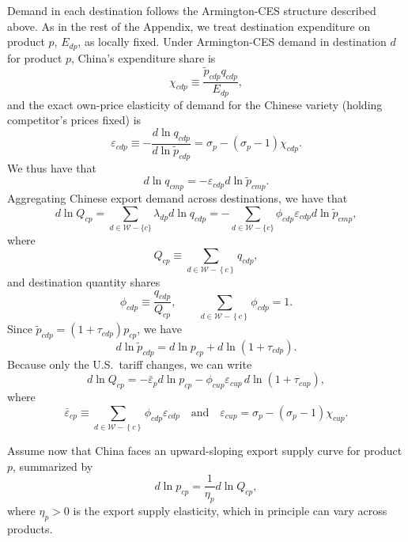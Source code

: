 \documentclass[english,12pt]{article}
\theoremstyle{definition}
\begin{document}
Demand in each destination follows the Armington-CES structure described
above. As in the rest of the Appendix, we treat destination expenditure on
product $p$, $E_{dp}$, as locally fixed. Under Armington-CES demand in
destination $d$ for product $p$, China's expenditure share is 
\begin{equation*}
\chi _{cdp}\equiv \frac{\tilde{p}_{cdp}q_{cdp}}{E_{dp}},
\end{equation*}%
and the exact own-price elasticity of demand for the Chinese variety
(holding competitor's prices fixed) is 
\begin{equation*}
\varepsilon _{cdp}\equiv -\frac{d\ln q_{cdp}}{d\ln \tilde{p}_{cdp}}=\sigma
_{p}-(\sigma _{p}-1)\chi _{cdp}.
\end{equation*}%
We thus have that 
\begin{equation*}
d\ln q_{cmp}=-\varepsilon _{cdp}d\ln \tilde{p}_{cmp}.
\end{equation*}%
Aggregating Chinese export demand across destinations, we have that 
\begin{equation*}
d\ln Q_{cp}=\sum_{d\in \mathcal{W}-\{c\}}\lambda _{dp}d\ln
q_{cdp}=-\sum_{d\in \mathcal{W}-\{c\}}\phi _{cdp}\varepsilon _{cdp}d\ln 
\tilde{p}_{cmp},
\end{equation*}%
where 
\begin{equation*}
Q_{cp}\equiv \sum_{d\in \mathcal{W}-\left\{ c\right\} }q_{cdp},
\end{equation*}%
and destination quantity shares 
\begin{equation*}
\phi _{cdp}\equiv \frac{q_{cdp}}{Q_{cp}},\qquad \sum_{d\in \mathcal{W}%
-\left\{ c\right\} }\phi _{cdp}=1.
\end{equation*}%
Since $\tilde{p}_{cdp}=(1+\tau _{cdp})p_{cp}$, we have 
\begin{equation*}
d\ln \tilde{p}_{cdp}=d\ln p_{cp}+d\ln \left( 1+\tau _{cdp}\right) .
\end{equation*}%
Because only the U.S.\ tariff changes, we can write 
\begin{equation*}
d\ln Q_{cp}=-\bar{\varepsilon}_{p}d\ln p_{cp}-\phi _{cup}\varepsilon
_{cup}\,d\ln (1+\tau _{cup}),
\end{equation*}%
where 
\begin{equation*}
\bar{\varepsilon}_{cp}\equiv \sum_{d\in \mathcal{W}-\left\{ c\right\} }\phi
_{cdp}\varepsilon _{cdp}\quad \text{and}\quad \varepsilon _{cup}=\sigma
_{p}-(\sigma _{p}-1)\chi _{cup}.
\end{equation*}

Assume now that China faces an upward-sloping export supply curve for
product $p$, summarized by 
\begin{equation*}
d\ln p_{cp}=\frac{1}{\eta _{p}}d\ln Q_{cp},
\end{equation*}%
where $\eta _{p}>0$ is the export supply elasticity, which in principle can
vary across products.
\end{document}
